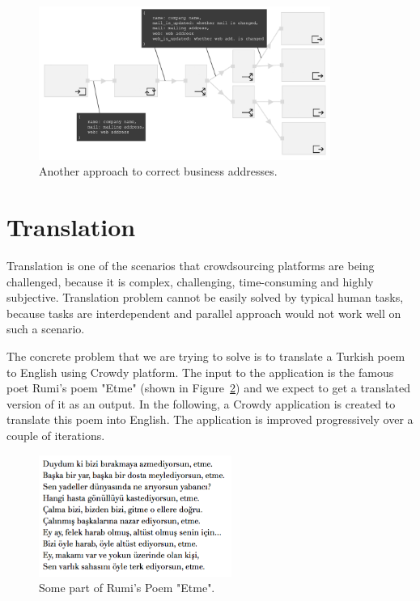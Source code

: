 \begin{figure}[ht]
	\centering
	\includegraphics[width=0.85\textwidth]{figures/scenarios/scenario1_2a.png}
	\caption{Another approach to correct business addresses.}
	\label{fig:scenario1.2}
\end{figure}

\newpage
\section{Translation}
Translation is one of the scenarios that crowdsourcing platforms are being challenged, because it is complex, challenging, time-consuming and highly subjective. Translation problem cannot be easily solved by typical human tasks, because tasks are interdependent and parallel approach would not work well on such a scenario.

The concrete problem that we are trying to solve is to translate a Turkish poem to English using Crowdy platform. The input to the application is the famous poet Rumi's poem "Etme" (shown in Figure~\ref{fig:scenario2.poem}) and we expect to get a translated version of it as an output. In the following, a Crowdy application  is created to translate this poem into English. The application is improved progressively over a couple of iterations.

\begin{figure}[ht]
	\centering
	\includegraphics[height=150px]{figures/scenarios/poem.png}
	\caption{Some part of Rumi's Poem "Etme".}
	\label{fig:scenario2.poem}
\end{figure}

